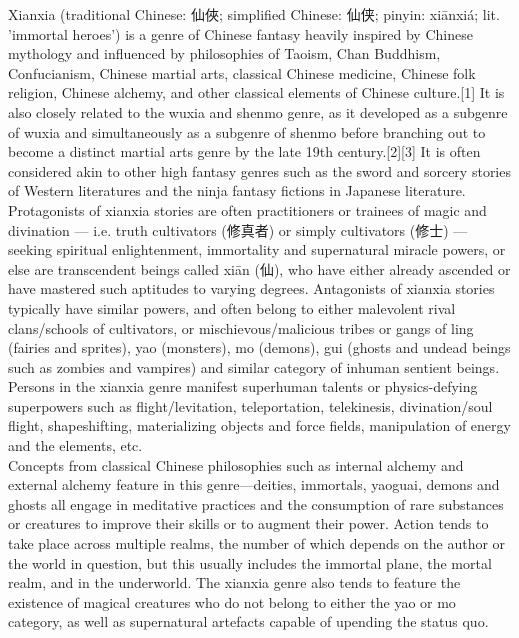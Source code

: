 Xianxia (traditional Chinese: 仙俠; simplified Chinese: 仙侠; pinyin: xiānxiá; lit. 'immortal heroes') is a genre of Chinese fantasy heavily inspired by Chinese mythology and influenced by philosophies of Taoism, Chan Buddhism, Confucianism, Chinese martial arts, classical Chinese medicine, Chinese folk religion, Chinese alchemy, and other classical elements of Chinese culture.[1] It is also closely related to the wuxia and shenmo genre, as it developed as a subgenre of wuxia and simultaneously as a subgenre of shenmo before branching out to become a distinct martial arts genre by the late 19th century.[2][3] It is often considered akin to other high fantasy genres such as the sword and sorcery stories of Western literatures and the ninja fantasy fictions in Japanese literature.\\

Protagonists of xianxia stories are often practitioners or trainees of magic and divination — i.e. truth cultivators (修真者) or simply cultivators (修士) — seeking spiritual enlightenment, immortality and supernatural miracle powers, or else are transcendent beings called xiān (仙), who have either already ascended or have mastered such aptitudes to varying degrees. Antagonists of xianxia stories typically have similar powers, and often belong to either malevolent rival clans/schools of cultivators, or mischievous/malicious tribes or gangs of ling (fairies and sprites), yao (monsters), mo (demons), gui (ghosts and undead beings such as zombies and vampires) and similar category of inhuman sentient beings. Persons in the xianxia genre manifest superhuman talents or physics-defying superpowers such as flight/levitation, teleportation, telekinesis, divination/soul flight, shapeshifting, materializing objects and force fields, manipulation of energy and the elements, etc.\\

Concepts from classical Chinese philosophies such as internal alchemy and external alchemy feature in this genre—deities, immortals, yaoguai, demons and ghosts all engage in meditative practices and the consumption of rare substances or creatures to improve their skills or to augment their power. Action tends to take place across multiple realms, the number of which depends on the author or the world in question, but this usually includes the immortal plane, the mortal realm, and in the underworld. The xianxia genre also tends to feature the existence of magical creatures who do not belong to either the yao or mo category, as well as supernatural artefacts capable of upending the status quo.
